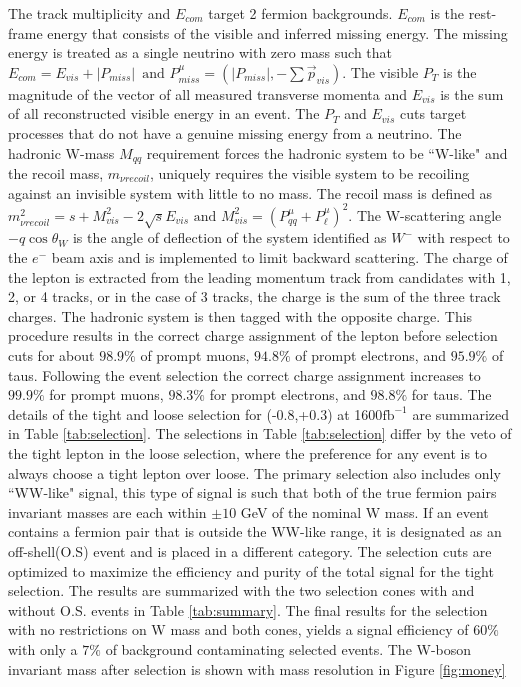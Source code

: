 The track multiplicity and $E_{com}$ target 2 fermion backgrounds. $E_{com}$ is the rest-frame energy that consists of the visible and inferred missing energy. The missing energy is treated as a single neutrino with zero mass such that $E_{com} = E_{vis} + |P_{miss}| \, \,  \, \text{and} \, \, P^\mu_{miss} = (|P_{miss}| , -\sum{\vec{p}_{vis}})$. The visible $P_T$ is the magnitude of the vector of all measured transverse momenta and $E_{vis}$ is the sum of all reconstructed visible energy in an event. The $P_T$ and $E_{vis}$ cuts target processes that do not have a genuine missing energy from a neutrino. The hadronic W-mass $M_{qq}$ requirement forces the hadronic system to be ``W-like" and the recoil mass, $m_{\nu recoil}$, uniquely requires the visible system to be recoiling against an invisible system with little to no mass. The recoil mass is defined as $m^2_{\nu recoil} = s + M^2_{vis} - 2\sqrt{s}E_{vis} \, \, \text{and} \, \, M^2_{vis} = ( P^{\mu}_{qq} +  P^{\mu}_{\ell})^2$. The W-scattering angle $-q\cos\theta_W$ is the angle of deflection of the system identified as $W^-$ with respect to the $e^-$ beam axis and is implemented to limit backward scattering.  The charge of the lepton is extracted from the leading momentum track from candidates with 1, 2, or 4 tracks, or in the case of 3 tracks, the charge is the sum of the three track charges. The hadronic system is then tagged with the opposite charge.  This procedure results in the correct charge assignment of the lepton before selection cuts for about $98.9\%$ of prompt muons, $94.8\%$ of prompt electrons, and $95.9\%$ of taus. Following the event selection the correct charge assignment increases to $99.9\%$ for prompt muons, $98.3\%$ for prompt electrons, and $98.8\%$ for taus. The details of the tight and loose selection for (-0.8,+0.3) at 1600$\text{fb}^{-1}$ are summarized in Table \ref{tab:selection}. The selections in Table \ref{tab:selection} differ by the veto of the tight lepton in the loose selection, where the preference for any event is to always choose a tight lepton over loose. The primary selection also includes only ``WW-like" signal, this type of signal is such that both of the true fermion pairs invariant masses are each within $\pm10$ GeV of the nominal W mass. If an event contains a fermion pair that is outside the WW-like range, it is designated as an off-shell(O.S) event and is placed in a different category. The selection cuts are optimized to maximize the efficiency and purity of the total signal for the tight selection. The results are summarized with the two selection cones with and without O.S. events in Table \ref{tab:summary}. The final results for the selection with no restrictions on W mass and both cones, yields a signal efficiency of $60\%$ with only a $7\%$ of background contaminating selected events. The W-boson invariant mass after selection is shown with mass resolution in Figure \ref{fig:money}


